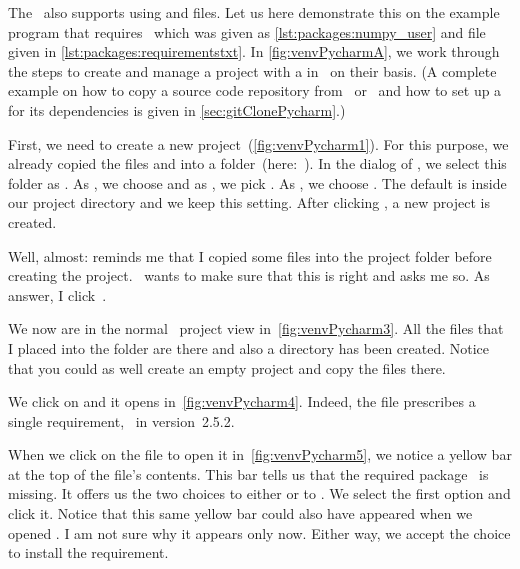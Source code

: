 %
The  \pycharm\ also supports using  and  files.
Let us here demonstrate this on the example program that requires \numpy\ which was given as \cref{lst:packages:numpy_user} and  file given in \cref{lst:packages:requirementstxt}.
In \cref{fig:venvPycharmA}, we work through the steps to create and manage a project with a  in \pycharm\ on their basis.
(A complete example on how to copy a source code repository from \git\ or \github\ and how to set up a  for its dependencies is given in \cref{sec:gitClonePycharm}.)

First, we need to create a new project~(\cref{fig:venvPycharm1}).
For this purpose, we already copied the files  and  into a folder~(here:~).
In the  dialog of \pycharm, we select this folder as .
As , we choose  and as , we pick .
As , we choose .
The default  is  inside our project directory and we keep this setting.
After clicking , a new project is created.

Well, almost:
 reminds me that I copied some files into the project folder before creating the project.
\pycharm\ wants to make sure that this is right and asks me so.
As answer, I click~.

We now are in the normal \pycharm\ project view in~\cref{fig:venvPycharm3}.
All the files that I placed into the folder are there and also a  directory has been created.
Notice that you could as well create an empty project and copy the files there.

We click on  and it opens in~\cref{fig:venvPycharm4}.
Indeed, the file prescribes a single requirement, \numpy\ in version~2.5.2.

When we click on the file  to open it in~\cref{fig:venvPycharm5}, we notice a yellow bar at the top of the file's contents.
This bar tells us that the required package \numpy\ is missing.
It offers us the two choices to either  or to .
We select the first option and click it.
Notice that this same yellow bar could also have appeared when we opened .
I am not sure why it appears only now.
Either way, we accept the choice to install the requirement.

